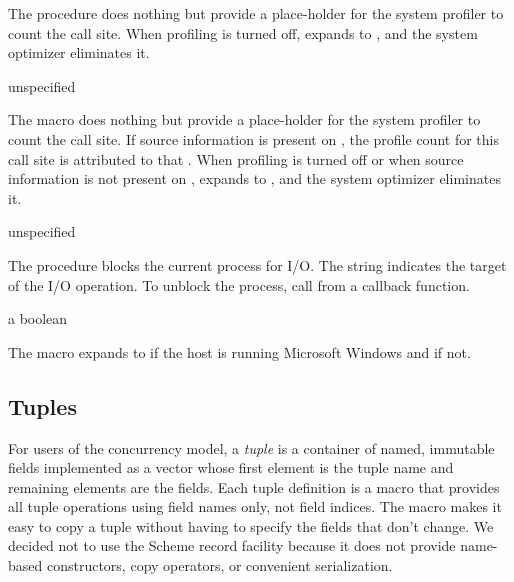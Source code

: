 The  procedure does nothing but provide a
place-holder for the system profiler to count the call site. When
profiling is turned off,  expands to
, and the system optimizer eliminates it.

\begin{syntax}
\end{syntax}
\returns{} unspecified

The  macro does nothing but provide a
place-holder for the system profiler to count the call site.
If source information is present on , the profile count
for this call site is attributed to that .
When profiling is turned off or when source information is not
present on ,  expands to
, and the system optimizer eliminates it.

\begin{procedure}
\end{procedure}
\returns{} unspecified

The  procedure blocks the current process for
I/O. The  string indicates the target of the I/O
operation. To unblock the process, call  from a
callback function.

\begin{syntax}
\end{syntax}
\expandsto{} a boolean

The  macro expands to  if the host is running
Microsoft Windows and  if not.

\subsection {Tuples}

For users of the concurrency model, a \emph{tuple} is a
container of named, immutable fields implemented as a vector whose
first element is the tuple name and remaining elements are the
fields. Each tuple definition is a macro that provides all tuple
operations using field names only, not field indices. The macro makes
it easy to copy a tuple without having to specify the fields that
don't change.  We decided not to use the Scheme record facility
because it does not provide name-based constructors, copy operators,
or convenient serialization.


